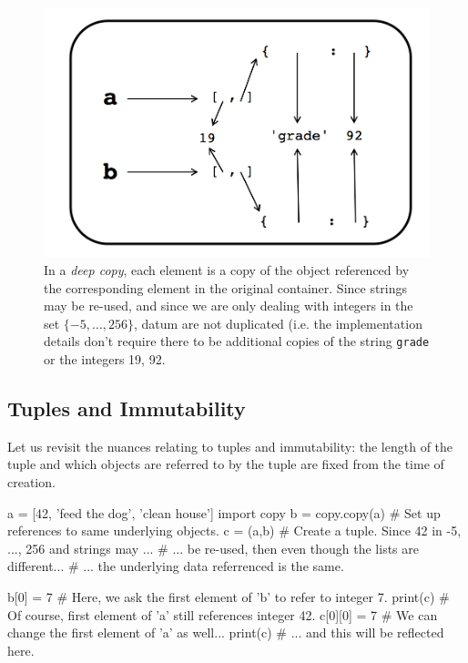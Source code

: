 \documentclass[12pt,letterpaper,twoside]{article}
\begin{document}
\begin{enumerate}
\begin{figure}[h]
\centering
\includegraphics[scale=0.35]{fig/deep-copy-mutables.png}
\caption{\small In a \emph{deep copy}, each element is a copy of the object referenced by the corresponding
  element in the original container. Since strings may be re-used, and since we are only dealing with
  integers in the set $\{-5, \ldots, 256\}$, datum are not duplicated (i.e. the implementation details
  don't require there to be additional copies of the string \texttt{grade} or the integers 19, 92.}
\end{figure}

\subsection{Tuples and Immutability}
Let us revisit the nuances relating to tuples and immutability: the length of the tuple and which objects
are referred to by the tuple are fixed from the time of creation.

\begin{python}
a = [42, 'feed the dog', 'clean house']
import copy
b = copy.copy(a)  # Set up references to same underlying objects.
c = (a,b)         # Create a tuple. Since 42 in {-5, ..., 256} and strings may ...
                  # ... be re-used, then even though the lists are different...
                  # ... the underlying data referrenced is the same.

b[0] = 7          # Here, we ask the first element of 'b' to refer to integer 7.
print(c)          # Of course, first element of 'a' still references integer 42.
c[0][0] = 7       # We can change the first element of 'a' as well...
print(c)          # ... and this will be reflected here.


\end{python}
\end{enumerate}
\end{document}
